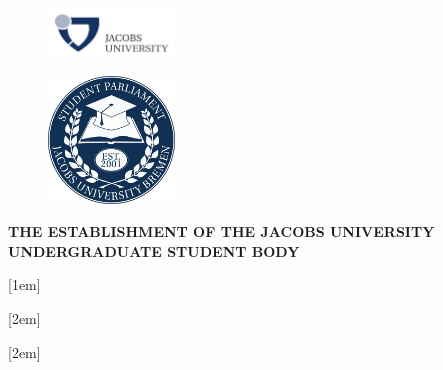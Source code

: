 \documentclass[12pt]{constitution}
\begin{document}


\begin{figure}[H]
    \centering
    \includegraphics[width=0.3\textwidth, right]{../misc/jacobs.png}
\end{figure}

\begin{figure}[H]
    \centering
    \includegraphics[width=0.3\textwidth]{../misc/usg.jpg}
\end{figure}

\begin{center}
\textbf{\Large{THE ESTABLISHMENT OF THE JACOBS UNIVERSITY\\
UNDERGRADUATE STUDENT BODY}}
\end{center}

\begingroup
\let\clearpage\relax
\setcounter{tocdepth}{3}

\makeatletter
\def\toclevel@part{0}
\def\toclevel@article{1}
[1em] {\bfseries} {\contentslabel{2.8em}} {\hspace*{-2.3em}} {\contentspage}
\def\toclevel@section{2}
[2em] {\normalfont} {\contentslabel{2.3em}} {\hspace*{-2.3em}} {\contentspage}
\def\toclevel@sectionstar{2}
[2em] {\normalfont} {\contentslabel{2.3em}} {\hspace*{-2.3em}} {\contentspage}
\makeatother

\renewcommand{\contentsname}{\centering Table of Contents}
\end{document}
